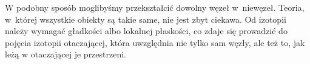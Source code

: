 W podobny sposób moglibyśmy przekształcić dowolny węzeł w~niewęzeł.
Teoria, w~której wszystkie obiekty są takie same, nie jest zbyt ciekawa.
Od izotopii należy wymagać gładkości albo lokalnej płaskości,
co zdaje się prowadzić do pojęcia izotopii otaczającej, która uwzględnia nie tylko sam węzły, ale też to, jak leżą w otaczającej je przestrzeni.

